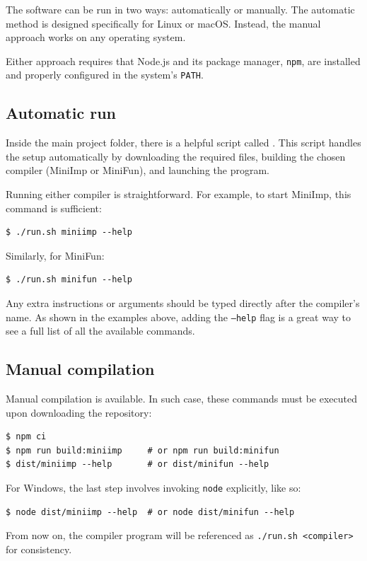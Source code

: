\documentclass[12pt]{article}
\begin{document}
The software can be run in two ways: automatically or manually. The automatic
method is designed specifically for Linux or macOS. Instead, the manual approach
works on any operating system.

Either approach requires that Node.js and its package manager, \texttt{npm}, are
installed and properly configured in the system's \texttt{PATH}.

\subsection{Automatic run}

Inside the main project folder, there is a helpful script called
. This script handles the setup automatically by downloading the
required files, building the chosen compiler (MiniImp or MiniFun), and launching
the program.

Running either compiler is straightforward. For example, to start MiniImp, this
command is sufficient:
\begin{verbatim}
$ ./run.sh miniimp --help
\end{verbatim}

Similarly, for MiniFun:
\begin{verbatim}
$ ./run.sh minifun --help
\end{verbatim}

Any extra instructions or arguments should be typed directly after the
compiler's name. As shown in the examples above, adding the \texttt{--help} flag
is a great way to see a full list of all the available commands.

\subsection{Manual compilation}

Manual compilation is available. In such case, these commands must be executed
upon downloading the repository:
\begin{verbatim}
$ npm ci
$ npm run build:miniimp     # or npm run build:minifun
$ dist/miniimp --help       # or dist/minifun --help
\end{verbatim}

For Windows, the last step involves invoking \texttt{node} explicitly, like so:
\begin{verbatim}
$ node dist/miniimp --help  # or node dist/minifun --help
\end{verbatim}

From now on, the compiler program will be referenced as \texttt{./run.sh
<compiler>} for consistency.
\end{document}
